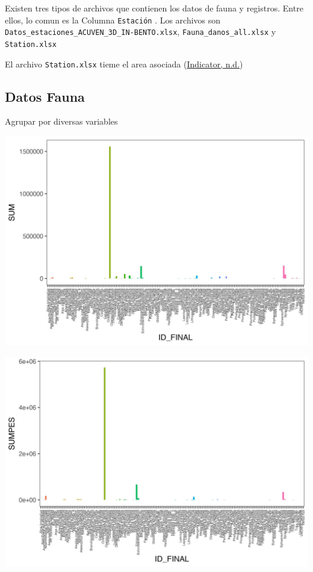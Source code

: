 \documentclass[
]{article}
\begin{document}
Existen tres tipos de archivos que contienen los datos de fauna y registros. Entre ellos, lo comun es la Columna \texttt{Estación} . Los archivos son \texttt{Datos\_estaciones\_ACUVEN\_3D\_IN-BENTO.xlsx}, \texttt{Fauna\_danos\_all.xlsx} y \texttt{Station.xlsx}

El archivo \texttt{Station.xlsx} tieme el area asociada
(\protect\hyperlink{ref-Indicator}{Indicator, n.d.})

\hypertarget{datos-fauna}{%
\subsection{Datos Fauna}\label{datos-fauna}}

Agrupar por diversas variables

\begin{center}\includegraphics{SAR_Method_files/figure-latex/unnamed-chunk-4-1} \end{center}

\begin{center}\includegraphics{SAR_Method_files/figure-latex/unnamed-chunk-5-1} \end{center}
\end{document}
